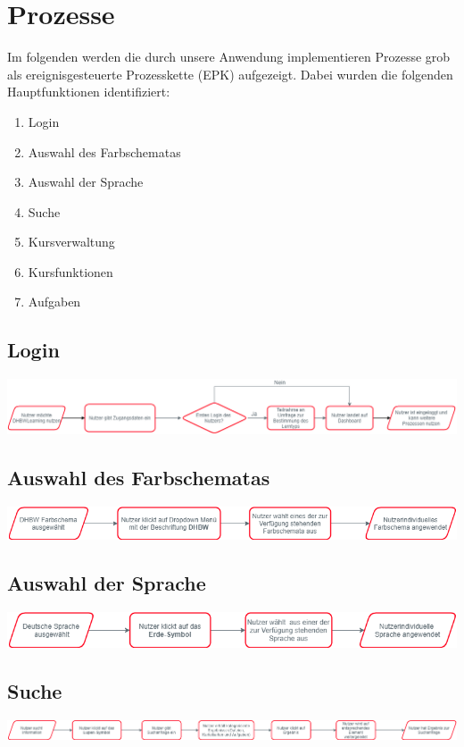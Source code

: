 
\chapter{Prozesse}
Im folgenden werden die durch unsere Anwendung implementieren Prozesse grob als ereignisgesteuerte Prozesskette (EPK) aufgezeigt. Dabei wurden die folgenden Hauptfunktionen identifiziert:
\begin{enumerate}
	\item Login
	\item Auswahl des Farbschematas
	\item Auswahl der Sprache
	\item Suche
	\item Kursverwaltung
	\item Kursfunktionen
	\item Aufgaben
\end{enumerate}

\section{Login}
	\includegraphics[width=\linewidth, keepaspectratio]{img/Prozesse/login}
\section{Auswahl des Farbschematas}
	\includegraphics[width=\linewidth, keepaspectratio]{img/Prozesse/color}
\section{Auswahl der Sprache}
	\includegraphics[width=\linewidth, keepaspectratio]{img/Prozesse/language}
\section{Suche}
	\includegraphics[width=\linewidth, keepaspectratio]{img/Prozesse/search}

